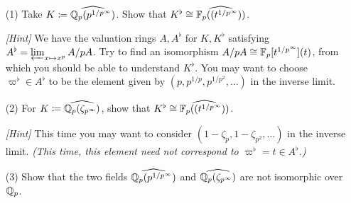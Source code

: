 \documentclass[12pt]{article}  %
\begin{document}
\begin{problem}[1]
\begin{enumerate}
  \item[(1)] Take $K\coloneqq \widehat{\mathbb{Q}_p(p^{1/p^\infty})}$.
  Show that $K^\flat\cong \widehat{\mathbb{F}_p((t^{1/p^\infty}))}$.

  \emph{[Hint]} We have the valuation rings $A,A^\flat$ for $K,K^\flat$ satisfying
  $A^\flat=\varprojlim_{x\mapsto x^p}A/pA$.
  Try to find an isomorphism $A/pA\cong \mathbb{F}_p[t^{1/p^\infty}](t)$,
  from which you should be able to understand $K^\flat$.
  You may want to choose $\varpi^\flat\in A^\flat$ to be the element given by
  $(p,p^{1/p},p^{1/p^2},\ldots)$ in the inverse limit.

  \item[(2)] For $K\coloneqq \widehat{\mathbb{Q}_p(\zeta_{p^\infty})}$, show that
  $K^\flat\cong \widehat{\mathbb{F}_p((t^{1/p^\infty}))}$.

  \emph{[Hint]} This time you may want to consider $(1-\zeta_p,1-\zeta_{p^2},\ldots)$
  in the inverse limit. \emph{(This time, this element need not correspond to
  $\varpi^\flat=t\in A^\flat$.)}

  \item[(3)] Show that the two fields $\widehat{\mathbb{Q}_p(p^{1/p^\infty})}$ and
  $\widehat{\mathbb{Q}_p(\zeta_{p^\infty})}$ are not isomorphic over $\mathbb{Q}_p$.
\end{enumerate}
\end{problem}
\end{document}
